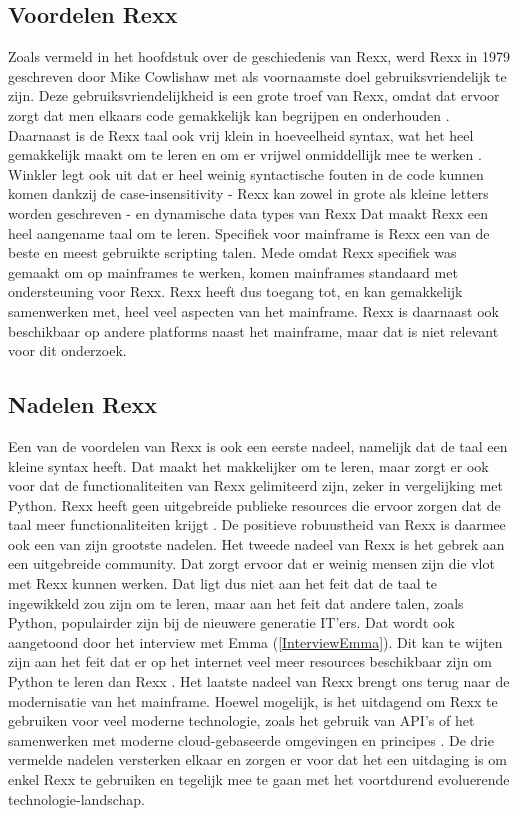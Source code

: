 \subsection{Voordelen Rexx}
Zoals vermeld in het hoofdstuk over de geschiedenis van Rexx, werd Rexx in 1979 geschreven door Mike Cowlishaw met als voornaamste doel gebruiksvriendelijk te zijn. Deze gebruiksvriendelijkheid is een grote troef van Rexx, omdat dat ervoor zorgt dat men elkaars code gemakkelijk kan begrijpen en onderhouden \autocite{Fosdick2005}. Daarnaast is de Rexx taal ook vrij klein in hoeveelheid syntax, wat het heel gemakkelijk maakt om te leren en om er vrijwel onmiddellijk mee te werken \autocite{Winkler2023}. Winkler legt ook uit dat er heel weinig syntactische fouten in de code kunnen komen dankzij de case-insensitivity - Rexx kan zowel in grote als kleine letters worden geschreven - en dynamische data types van Rexx Dat maakt Rexx een heel aangename taal om te leren. Specifiek voor mainframe is Rexx een van de beste en meest gebruikte scripting talen. Mede omdat Rexx specifiek was gemaakt om op mainframes te werken, komen mainframes standaard met ondersteuning voor Rexx. Rexx heeft dus toegang tot, en kan gemakkelijk samenwerken met, heel veel aspecten van het mainframe. Rexx is daarnaast ook beschikbaar op andere platforms naast het mainframe, maar dat is niet relevant voor dit onderzoek.

\subsection{Nadelen Rexx}
Een van de voordelen van Rexx is ook een eerste nadeel, namelijk dat de taal een kleine syntax heeft. Dat maakt het makkelijker om te leren, maar zorgt er ook voor dat de functionaliteiten van Rexx gelimiteerd zijn, zeker in vergelijking met Python. Rexx heeft geen uitgebreide publieke resources die ervoor zorgen dat de taal meer functionaliteiten krijgt \autocite{Sadavarte2022}. De positieve robuustheid van Rexx is daarmee ook een van zijn grootste nadelen. Het tweede nadeel van Rexx is het gebrek aan een uitgebreide community. Dat zorgt ervoor dat er weinig mensen zijn die vlot met Rexx kunnen werken. Dat ligt dus niet aan het feit dat de taal te ingewikkeld zou zijn om te leren, maar aan het feit dat andere talen, zoals Python, populairder zijn bij de nieuwere generatie IT’ers. Dat wordt ook aangetoond door het interview met Emma (\ref{InterviewEmma}). Dit kan te wijten zijn aan het feit dat er op het internet veel meer resources beschikbaar zijn om Python te leren dan Rexx \autocite{OMPMWG2024}. Het laatste nadeel van Rexx brengt ons terug naar de modernisatie van het mainframe. Hoewel mogelijk, is het uitdagend om Rexx te gebruiken voor veel moderne technologie, zoals het gebruik van API’s of het samenwerken met moderne cloud-gebaseerde omgevingen en principes \autocite{OMPMWG2024}. De drie vermelde nadelen versterken elkaar en zorgen er voor dat het een uitdaging is om enkel Rexx te gebruiken en tegelijk mee te gaan met het voortdurend evoluerende technologie-landschap.

